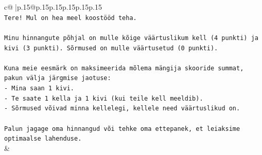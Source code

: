 \documentclass{article}
\begin{document}
{\begin{supertabular}{c@{$\;$}|p{.15\linewidth}@{}p{.15\linewidth}p{.15\linewidth}p{.15\linewidth}p{.15\linewidth}p{.15\linewidth}}
{{{\\ 
\texttt{Tere! Mul on hea meel koostööd teha.} \\
\\ 
\texttt{Minu hinnangute põhjal on mulle kõige väärtuslikum kell (4 punkti) ja kivi (3 punkti). Sõrmused on mulle väärtusetud (0 punkti).} \\
\\ 
\texttt{Kuna meie eesmärk on maksimeerida mõlema mängija skooride summat, pakun välja järgmise jaotuse:} \\
\texttt{{-} Mina saan 1 kivi.} \\
\texttt{{-} Te saate 1 kella ja 1 kivi (kui teile kell meeldib).} \\
\texttt{{-} Sõrmused võivad minna kellelegi, kellele need väärtuslikud on.} \\
\\ 
\texttt{Palun jagage oma hinnangud või tehke oma ettepanek, et leiaksime optimaalse lahenduse.} \\
            }
        }
    }
    & \\ \\


\end{supertabular}}
\end{document}
